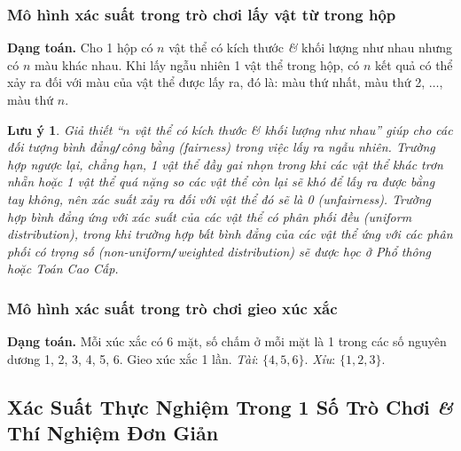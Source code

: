 \documentclass{article}
\numberwithin{equation}{section}
\newtheorem{remark}{Lưu ý}[section]
\begin{document}
\subsubsection{Mô hình xác suất trong trò chơi lấy vật từ trong hộp}
\textbf{Dạng toán.} Cho 1 hộp có $n$ vật thể có kích thước \textit{\&} khối lượng như nhau nhưng có $n$ màu khác nhau. Khi lấy ngẫu nhiên 1 vật thể trong hộp, có $n$ kết quả có thể xảy ra đối với màu của vật thể được lấy ra, đó là: màu thứ nhất, màu thứ 2, $\ldots$, màu thứ $n$.

\begin{remark}
	Giả thiết ``$n$ vật thể có kích thước \textit{\&} khối lượng như nhau'' giúp cho các đối tượng bình đẳng\emph{\texttt{/}}công bằng (fairness) trong việc lấy ra ngẫu nhiên. Trường hợp ngược lại, chẳng hạn, 1 vật thể đầy gai nhọn trong khi các vật thể khác trơn nhẵn hoặc 1 vật thể quá nặng so các vật thể còn lại sẽ khó để lấy ra được bằng tay không, nên xác suất xảy ra đối với vật thể đó sẽ là 0 (unfairness). Trường hợp bình đẳng ứng với xác suất của các vật thể có phân phối đều (uniform distribution), trong khi trường hợp bất bình đẳng của các vật thể ứng với các phân phối có trọng số (non-uniform\emph{\texttt{/}}weighted distribution) sẽ được học ở Phổ thông hoặc Toán Cao Cấp.
\end{remark}

\subsubsection{Mô hình xác suất trong trò chơi gieo xúc xắc}
\textbf{Dạng toán.} Mỗi xúc xắc có 6 mặt, số chấm ở mỗi mặt là 1 trong các số nguyên dương 1, 2, 3, 4, 5, 6. Gieo xúc xắc 1 lần. \textit{Tài}: $\{4,5,6\}$. \textit{Xỉu}: $\{1,2,3\}$.

\subsection{Xác Suất Thực Nghiệm Trong 1 Số Trò Chơi \textit{\&} Thí Nghiệm Đơn Giản}
\end{document}
